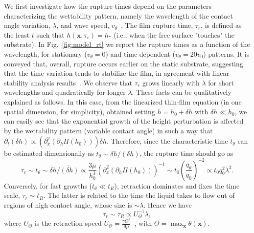 \documentclass[amsmath,amssymb,showpacs,prf,superscriptaddress, longbibliography]{revtex4-1} %
\begin{document}
 We first investigate how the rupture times depend on the parameters characterizing the wettability pattern, namely the wavelength of the contact angle variation, $\lambda$, and wave speed, $v_{\theta}$~\cite{karguptaMorphologicalSelforganizationDewetting2002,karguptaInstabilityPatternFormation2000,nisatoExcitationSurfaceDeformation1999,karimPhaseSeparationUltrathin1998, succiLatticeBoltzmannEquation2001}.
The film rupture time, $\tau_r$, is defined as the least $t$ such that $h(\mathbf{x},\tau_r)=h_{\ast}$ (i.e., when the free surface "touches" the substrate).
In Fig.~\ref{fig:model_rt} we report the rupture times as a function of the wavelength, for stationary ($v_{\theta}=0$) and time-dependent ($v_{\theta}=20 v_0$) patterns. 
It is conveyed that, overall, rupture occurs earlier on the static substrate, suggesting that the time variation tends to stabilize the film, in agreement with linear stability analysis results~\cite{sumanDynamicsThinLiquid2006}.
We observe that $\tau_r$ grows linearly with $\lambda$ for short wavelengths and quadratically for longer $\lambda$.
These facts can be qualitatively explained as follows. 
In this case, from the linearized thin-film equation (in one spatial dimension, for simplicity), obtained setting $h=h_0 + \delta h$ with $\delta h \ll h_0$, 
we can easily see that the exponential growth of the height perturbation is affected by the wettability pattern (variable contact angle) in such a way that $\partial_t (\delta h) \propto (\partial_x^2 (\partial_h\Pi(h_0))) \delta h$. Therefore, since the characteristic time $t_{\theta}$ can be estimated dimensionally as $t_{\theta} \sim \delta h/\dot{(\delta h)}$, the rupture time should go as
\begin{equation}\label{eq:taur_l2}
    \tau_r \sim t_{\theta} \sim  \delta h/\dot{(\delta h)} \propto \frac{3\mu}{h_0^3}(\partial_x^2 (\partial_h\Pi (h_0)))^{-1} \sim t_0 \left(\frac{q_{\theta}}{q_0}\right)^{-2} \propto t_0 q_0^2 \lambda^2.
\end{equation}
Conversely, for fast growths ($t_{\theta} \ll t_R$), retraction dominates and fixes the time scale, $\tau_r \sim t_R$. 
The latter is related to the time the liquid takes to flow out of regions of high contact angle, whose size is $\sim \lambda$. 
Hence we have 
\begin{equation}\label{eq:taur_l1}
 \tau_r \sim \tau_R \propto U_{\Theta}^{-1}\lambda,
\end{equation}
where $U_{\Theta}$ is the retraction speed $U_{\Theta} = \frac{\gamma \Theta^3}{9\mu}$~\cite{edwardsNotSpreadingReverse2016a}, with $\Theta = \max_{\mathbf{x}}\theta(\mathbf{x})$.
\end{document}

